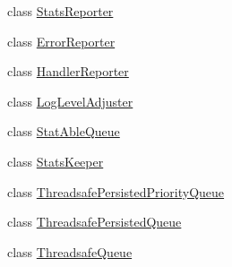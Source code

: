 \begin{DoxyCompactItemize}
\item 
class \hyperlink{a00043}{Stats\-Reporter}
\item 
class \hyperlink{a00023}{Error\-Reporter}
\item 
class \hyperlink{a00027}{Handler\-Reporter}
\item 
class \hyperlink{a00030}{Log\-Level\-Adjuster}
\item 
class \hyperlink{a00041}{Stat\-Able\-Queue}
\item 
class \hyperlink{a00042}{Stats\-Keeper}
\item 
class \hyperlink{a00044}{Threadsafe\-Persisted\-Priority\-Queue}
\item 
class \hyperlink{a00045}{Threadsafe\-Persisted\-Queue}
\item 
class \hyperlink{a00046}{Threadsafe\-Queue}
\end{DoxyCompactItemize}
